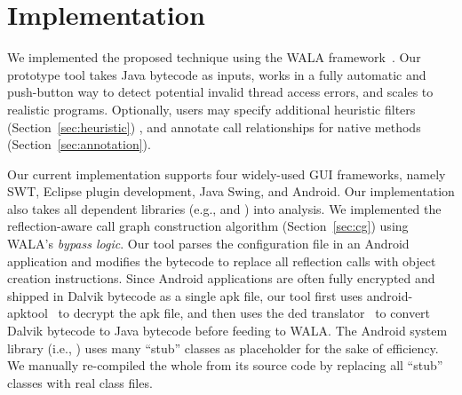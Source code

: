 \section{Implementation}
\label{sec:implementation}

We implemented the proposed technique using the WALA framework~\cite{walatutorial}.
Our prototype tool takes Java bytecode as inputs, works in a fully
automatic and push-button way to detect potential invalid thread access
errors, and scales to realistic programs.  
Optionally, users may specify additional heuristic filters (Section~\ref{sec:heuristic}) %
, and annotate call relationships for native methods (Section~\ref{sec:annotation}).

Our current implementation supports four widely-used GUI frameworks, namely
SWT, Eclipse plugin development, Java Swing, and Android.
Our implementation %
also takes
all dependent libraries (e.g.,  and )
into analysis. We implemented the reflection-aware call graph construction
 algorithm (Section~\ref{sec:cg})
using WALA's \textit{bypass logic}. Our tool parses the configuration file
in an Android application and modifies the bytecode to replace all
reflection calls with object creation instructions.
Since Android applications are often fully encrypted and shipped in Dalvik
bytecode as a single apk file, our tool first uses
android-apktool~\cite{apktool} to
decrypt the apk file, and then uses the 
ded translator~\cite{Enck:2011:SAA:2028067.2028088} to convert
Dalvik bytecode to Java bytecode before feeding to WALA.  The Android system
library (i.e., ) uses many ``stub'' classes as
placeholder for the sake of efficiency. We manually re-compiled the whole
 from its source code by replacing all ``stub'' classes
with real class files.


